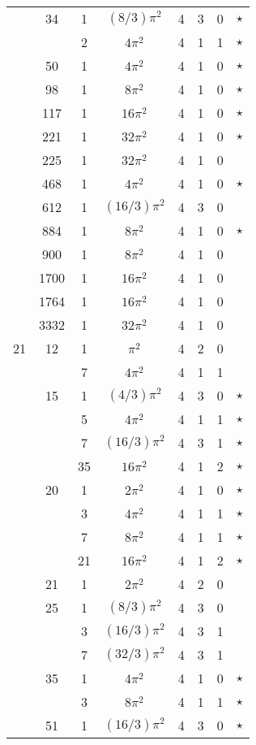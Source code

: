 \documentclass[12pt]{amsart}
\begin{document}
\begin{tabular}{ccc|ccccc}
 & 34 & 1 & $(8/3)\pi^2$ & 4 & 3 & 0 & $\star$ \\
 &  & 2 & $4\pi^2$ & 4 & 1 & 1 & $\star$ \\
 & 50 & 1 & $4\pi^2$ & 4 & 1 & 0 & $\star$ \\
 & 98 & 1 & $8\pi^2$ & 4 & 1 & 0 & $\star$ \\
 & 117 & 1 & $16\pi^2$ & 4 & 1 & 0 & $\star$ \\
 & 221 & 1 & $32\pi^2$ & 4 & 1 & 0 & $\star$ \\
 & 225 & 1 & $32\pi^2$ & 4 & 1 & 0 &  \\
 & 468 & 1 & $4\pi^2$ & 4 & 1 & 0 & $\star$ \\
 & 612 & 1 & $(16/3)\pi^2$ & 4 & 3 & 0 &  \\
 & 884 & 1 & $8\pi^2$ & 4 & 1 & 0 & $\star$ \\
 & 900 & 1 & $8\pi^2$ & 4 & 1 & 0 &  \\
 & 1700 & 1 & $16\pi^2$ & 4 & 1 & 0 &  \\
 & 1764 & 1 & $16\pi^2$ & 4 & 1 & 0 &  \\
 & 3332 & 1 & $32\pi^2$ & 4 & 1 & 0 &  \\
21 & 12 & 1 & $\pi^2$ & 4 & 2 & 0 &  \\
 &  & 7 & $4\pi^2$ & 4 & 1 & 1 &  \\
 & 15 & 1 & $(4/3)\pi^2$ & 4 & 3 & 0 & $\star$ \\
 &  & 5 & $4\pi^2$ & 4 & 1 & 1 & $\star$ \\
 &  & 7 & $(16/3)\pi^2$ & 4 & 3 & 1 & $\star$ \\
 &  & 35 & $16\pi^2$ & 4 & 1 & 2 & $\star$ \\
 & 20 & 1 & $2\pi^2$ & 4 & 1 & 0 & $\star$ \\
 &  & 3 & $4\pi^2$ & 4 & 1 & 1 & $\star$ \\
 &  & 7 & $8\pi^2$ & 4 & 1 & 1 & $\star$ \\
 &  & 21 & $16\pi^2$ & 4 & 1 & 2 & $\star$ \\
 & 21 & 1 & $2\pi^2$ & 4 & 2 & 0 &  \\
 & 25 & 1 & $(8/3)\pi^2$ & 4 & 3 & 0 &  \\
 &  & 3 & $(16/3)\pi^2$ & 4 & 3 & 1 &  \\
 &  & 7 & $(32/3)\pi^2$ & 4 & 3 & 1 &  \\
 & 35 & 1 & $4\pi^2$ & 4 & 1 & 0 & $\star$ \\
 &  & 3 & $8\pi^2$ & 4 & 1 & 1 & $\star$ \\
 & 51 & 1 & $(16/3)\pi^2$ & 4 & 3 & 0 & $\star$ \\

\end{tabular}
\end{document}
